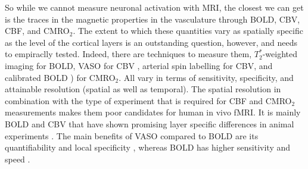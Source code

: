 So while we cannot measure neuronal activation with MRI, the closest we can get is the traces in the magnetic properties in the vasculature through BOLD, CBV, CBF, and CMRO$_{2}$. The extent to which these quantities vary as spatially specific as the level of the cortical layers is an outstanding question, however, and needs to empiraclly tested. Indeed, there are techniques to measure them, $T_2^*$-weighted imaging \cite{Norris2006} for BOLD, VASO for CBV \cite{Huber2018}, arterial spin labelling \cite{Grade2015} for CBV, and calibrated BOLD \cite{Blockley2013}) for CMRO$_{2}$. All vary in terms of sensitivity, specificity, and attainable resolution (spatial as well as temporal). The spatial resolution in combination with the type of experiment that is required for CBF and CMRO$_2$ measurements makes them poor candidates for human in vivo fMRI. It is mainly BOLD and CBV that have shown promising layer specific differences in animal experiments \cite{Lu2004,Zhao2006,Jin2008,Goense2012}. The main benefits of VASO compared to BOLD are its quantifiability \cite{Lu2003} and local specificity \cite{Jin2006}, whereas BOLD has higher sensitivity and speed \cite{Huber2018}.

